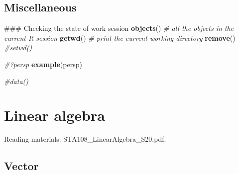 \documentclass[12pt,]{book}
\newenvironment{Shaded}{\begin{snugshade}}{\end{snugshade}}
\newcommand{\KeywordTok}[1]{\textcolor[rgb]{0.13,0.29,0.53}{\textbf{#1}}}
\newcommand{\CommentTok}[1]{\textcolor[rgb]{0.56,0.35,0.01}{\textit{#1}}}
\newcommand{\NormalTok}[1]{#1}
\begin{document}
\section{Miscellaneous}\label{miscellaneous}

\begin{Shaded}
\begin{Highlighting}[]
\NormalTok{### Checking the state of work session}
\KeywordTok{objects}\NormalTok{()  }\CommentTok{# all the objects in the current R session}
\KeywordTok{getwd}\NormalTok{()  }\CommentTok{# print the current working directory}
\KeywordTok{remove}\NormalTok{()}
\CommentTok{#setwd()}

\CommentTok{#?persp}
\KeywordTok{example}\NormalTok{(persp)}

\CommentTok{#data()}
\end{Highlighting}
\end{Shaded}

\chapter{Linear algebra}\label{ch:algebra}

Reading materials: STA108\_LinearAlgebra\_S20.pdf.

\section{Vector}\label{vector}
\end{document}
